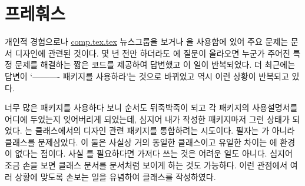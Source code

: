 \chapter{프레훠스}
%
개인적 경험으로나 \url{comp.tex.tex} 뉴스그룹을 보거나 \ltx 을 사용함에 있어 주요 문제는 
문서 디자인에 관련된 것이다.
몇 년 전만 하더라도 \ctt 에 질문이 올라오면 누군가 주어진 특정 문제를 해결하는 
짧은 코드를 제공하여 답변했고 이 일이 반복되었다.
더 최근에는 답변이 ‘----------{} 패키지를 사용하라’는 것으로 바뀌었고 역시
이런 상황이 반복되고 있다.

너무 많은 패키지를 사용하다 보니 순서도 뒤죽박죽이 되고 각 패키지의 사용설명서를 어디에 두었는지 잊어버리게 되었는데, 심지어 내가 작성한 패키지마저 그런 상태가 되었다.
는  클래스에서의 디자인 관련 패키지를 통합하려는 시도이다.
필자는 가 아니라  클래스를 문제삼았다. 이 둘은 사실상 거의 동일한 클래스이고 유일한 차이는 에  환경이 없다는 점이다. 
사실 를 필요하다면 가져다 쓰는 것은 어려운 일도 아니다. 
심지어 조금 손을 보면  클래스 문서를  문서처럼 보이게 하는 것도 가능하다. 이런 관점에서 여러 상황에 맞도록 손보는 일을 유념하여  클래스를 작성하였다.

